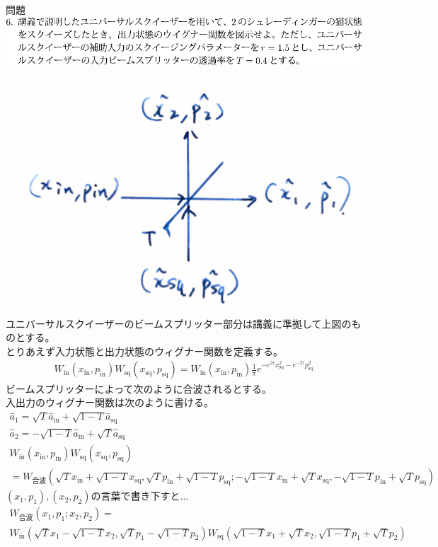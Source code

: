 \documentclass{jsarticle}
\newcommand{\mr}[1]{\mathrm{#1}}
\begin{document}
\newpage
\begin{itembox}[l]{問題}
	\vspace*{-0mm}
	\centering
	\includegraphics[width=1\linewidth]{./graphics/6.pdf}
\end{itembox}

\includegraphics[width=0.5\linewidth]{./graphics/HBS.pdf}\\
ユニバーサルスクイーザーのビームスプリッター部分は講義に準拠して上図のものとする。\\
とりあえず入力状態と出力状態のウィグナー関数を定義する。
\begin{gather*}
	W_\mr{in}(x_\mr{in},p_\mr{in})W_\mr{sq}(x_\mr{sq}, p_\mr{sq})
	=
	W_\mr{in}(x_\mr{in},p_\mr{in})\frac{1}{\pi} e^{-e^{2r}x_\mr{sq}^2 - e^{-2r}p_\mr{sq}^2}
\end{gather*}
ビームスプリッターによって次のように合波されるとする。\\
入出力のウィグナー関数は次のように書ける。
\begin{gather*}
	\hat{a}_1 = \sqrt{T} \hat{a}_\mr{in} + \sqrt{1-T} \hat{a}_\mr{sq}\\
	\hat{a}_2 = -\sqrt{1-T}\hat{a}_\mr{in} + \sqrt{T} \hat{a}_\mr{sq}\\
	W_\mr{in}(x_\mr{in},p_\mr{in})W_\mr{sq}(x_\mr{sq}, p_\mr{sq})\\
	= W_\text{合波}(\sqrt{T} x_\mr{in} + \sqrt{1-T} x_\mr{sq}, \sqrt{T} p_\mr{in} + \sqrt{1-T} p_\mr{sq}; -\sqrt{1-T}x_\mr{in} + \sqrt{T} x_\mr{sq}, -\sqrt{1-T}p_\mr{in} + \sqrt{T} p_\mr{sq})
\end{gather*}
$(x_1,p_1),(x_2,p_2)$の言葉で書き下すと...
\begin{gather*}
	W_\text{合波}(x_1,p_1; x_2,p_2)
	=\\
	W_\mr{in}(\sqrt{T}x_1 - \sqrt{1-T}x_2,\sqrt{T}p_1 - \sqrt{1-T}p_2)
	W_\mr{sq}(\sqrt{1-T} x_1 + \sqrt{T} x_2 ,  \sqrt{1-T} p_1 + \sqrt{T} p_2 )
\end{gather*}\\
\end{document}
